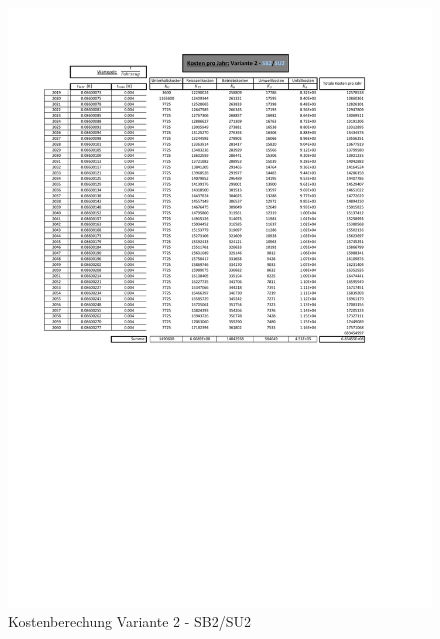 \begin{figure}[h!]
	\centering
	\includegraphics[width=\textwidth]{figures/Anhang/f-00-A-V2-B2-U2}
	\caption{Kostenberechung Variante 2 - SB2/SU2}
\end{figure}


